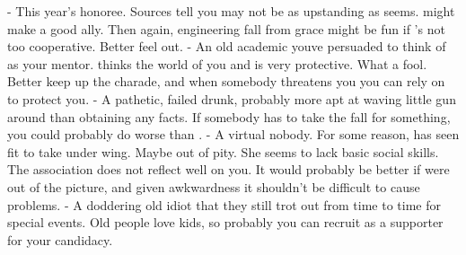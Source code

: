 \documentclass[char]{guildcamp4}
\begin{document}
\begin{contacts}
	\contact{\cMackey{}} - This year's honoree. Sources tell you \cMackey{\they} may not be as upstanding as \cMackey{\they} seems.  might make a good ally. Then again, engineering \cMackey{\their} fall from grace might be fun if 's not too cooperative. Better feel \cMackey{\them}  out.
	\contact{\cHistorian{}} - An old academic youve persuaded to think of  as your mentor.  thinks the world of you and is very protective. What a fool. Better keep up the charade, and when somebody threatens you you can rely on  to protect you.
	\contact{\cMarlowe{}} - A pathetic, failed drunk, probably more apt at waving  little gun around than obtaining any facts. If somebody has to take the fall for something, you could probably do worse than .
	\contact{\cLisbet{}} - A virtual nobody. For some reason, \cHistorian{} has seen fit to take  under  wing. Maybe out of pity. She seems to lack basic social skills. The association does not reflect well on you. It would probably be better if  were out of the picture, and given  awkwardness it shouldn't be difficult to cause  problems.
	\contact{\cTeaLady{}} - A doddering old idiot that they still trot out from time to time for special events. Old people love kids, so probably you can recruit  as a supporter for your candidacy.
\end{contacts}
\end{document}
